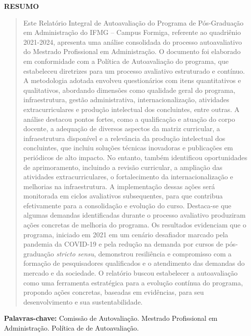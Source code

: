 \newenvironment{meuresumo}{
  \clearpage
  \small
  \vspace{-1cm}
  \begin{center}
    \bfseries RESUMO
    \vspace{0.5em}
  \end{center}
  \begin{quote}
}{
  \end{quote}
  \vspace{-1.1em}
  \begin{center}
  \begin{minipage}{0.87\textwidth} 
  \textbf{Palavras-chave:} Comissão de Autovaliação. 
  Mestrado Profissional em Administração. Política de de Autoavaliação.
  \end{minipage}
  \end{center}
  \clearpage
}

\begin{meuresumo}
Este Relatório Integral de Autoavaliação do Programa de Pós-Graduação 
em Administração do IFMG – Campus Formiga, referente ao quadriênio 
2021-2024, apresenta uma análise consolidada do processo autoavaliativo do
Mestrado Profissional em Administração. O documento foi elaborado em 
conformidade com a Política de Autoavaliação do programa, que estabeleceu
diretrizes para um processo avaliativo estruturado e contínuo. A 
metodologia adotada envolveu questionários com itens quantitativos e 
qualitativos, abordando dimensões como qualidade geral do programa, 
infraestrutura, gestão administrativa, internacionalização, atividades 
extracurriculares e produção intelectual dos concluintes, entre outras. 
A análise destacou pontos fortes, como a qualificação e atuação do corpo 
docente, a adequação de diversos aspectos da matriz curricular, a 
infraestrutura disponível e a relevância da produção intelectual dos 
concluintes, que incluiu soluções técnicas inovadoras e publicações em 
periódicos de alto impacto. No entanto, também identificou oportunidades 
de aprimoramento, incluindo a revisão curricular, a ampliação das 
atividades extracurriculares, o fortalecimento da internacionalização e 
melhorias na infraestrutura. A implementação dessas ações será monitorada 
em ciclos avaliativos subsequentes, para que contribua efetivamente para 
a consolidação e evolução do curso. Destaca-se que algumas demandas 
identificadas durante o processo avaliativo produziram ações concretas 
de melhoria do programa. Os resultados evidenciam que o programa, 
iniciado em 2021 em um cenário desafiador marcado pela pandemia da COVID-19 
e pela redução na demanda por cursos de pós-graduação \textit{stricto sensu}, 
demonstrou resiliência e compromisso com a formação de pesquisadores 
qualificados e o atendimento das demandas do mercado e da sociedade. 
O relatório buscou estabelecer a autoavaliação como uma ferramenta 
estratégica para a evolução contínua do programa, propondo ações 
concretas, baseadas em evidências, para seu desenvolvimento e 
sua sustentabilidade.
\end{meuresumo}



\clearpage
{}


